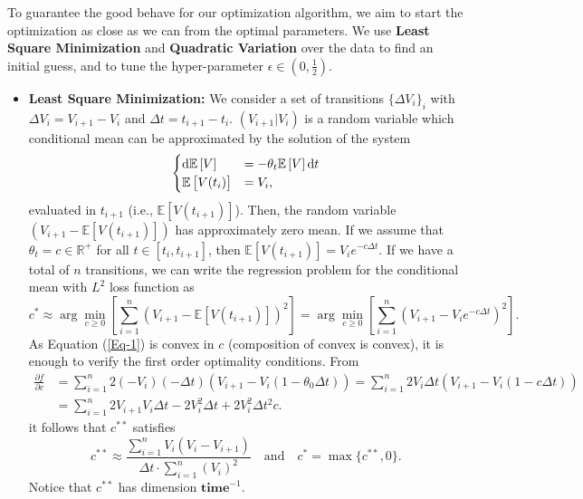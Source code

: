 \documentclass[11pt]{article}
\theoremstyle{definition}
\newcommand{\E}{\mathbb{E}}
\newcommand{\R}{\mathbb{R}}
\begin{document}
To guarantee the good behave for our optimization algorithm, we aim to start the optimization as close as we can from the optimal parameters. We use \textbf{Least Square Minimization} and \textbf{Quadratic Variation} over the data to find an initial guess, and to tune the hyper-parameter $\epsilon\in(0,\frac{1}{2})$.

\begin{itemize}

\item \textbf{Least Square Minimization:} We consider a set of transitions $\{\Delta V_i\}_{i}$ with $\Delta V_i=V_{i+1}-V_i$ and $\Delta t=t_{i+1}-t_i$. $(V_{i+1}|V_i)$ is a random variable which conditional mean can be approximated by the solution of the system
\begin{equation*}
\begin{cases}
\dif \E\left[V\right]&=-\theta_t\E\left[V\right]\dif t\\
\E\left[V(t_i)\right]&=V_i,
\end{cases}
\end{equation*}
evaluated in $t_{i+1}$ (i.e., $\E\left[V(t_{i+1})\right]$). Then, the random variable $(V_{i+1}-\E\left[V(t_{i+1})\right])$ has approximately zero mean. If we assume that $\theta_t=c\in\R^+$ for all $t\in[t_i,t_{i+1}]$, then $\E\left[V(t_{i+1})\right]=V_ie^{-c\Delta t}$. If we have a total of $n$ transitions, we can write the regression problem for the conditional mean with $L^2$ loss function as
\begin{equation}
c^*\approx\arg\min_{c\geq0}\left[\sum_{i=1}^n\left(V_{i+1}-\E\left[V(t_{i+1})\right]\right)^2\right]=\arg\min_{c\geq0}\left[\sum_{i=1}^n\left(V_{i+1}-V_ie^{-c\Delta t}\right)^2\right].
\label{Eq-1}
\end{equation}
As Equation (\ref{Eq-1}) is convex in $c$ (composition of convex is convex), it is enough to verify the first order optimality conditions. From
\begin{equation*}
\begin{split}
\frac{\partial f}{\partial c}&=\sum_{i=1}^n2(-V_i)(-\Delta t)(V_{i+1}-V_i(1-\theta_0\Delta t))
=\sum_{i=1}^n2V_i\Delta t(V_{i+1}-V_i(1-c\Delta t))\\
&=\sum_{i=1}^n2V_{i+1}V_i\Delta t-2V_i^2\Delta t+2V_i^2\Delta t^2c.
\end{split}
\end{equation*}
it follows that $c^{**}$ satisfies
\begin{equation}
c^{**}\approx\frac{\sum_{i=1}^nV_i(V_i-V_{i+1})}{\Delta t\cdot\sum_{i=1}^n(V_i)^2}\quad\text{and}\quad c^*=\max\{c^{**},0\}.
\label{Eq-4}
\end{equation}
Notice that $c^{**}$ has dimension $\mathbf{time}^{-1}$.


\end{itemize}
\end{document}
